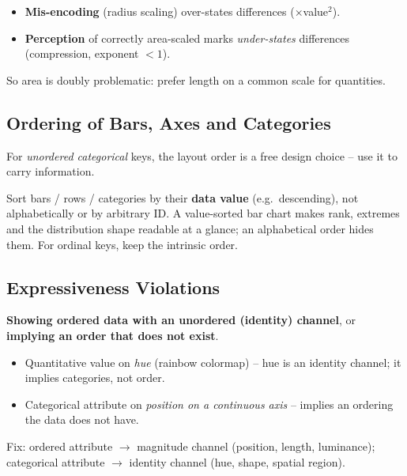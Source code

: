 \begin{keybox}
\begin{itemize}
  \item \textbf{Mis-encoding} (radius scaling) over-states differences
    ($\times$value$^2$).
  \item \textbf{Perception} of correctly area-scaled marks \emph{under-states}
    differences (compression, exponent $<1$).
\end{itemize}
So area is doubly problematic: prefer length on a common scale for quantities.
\end{keybox}

\subsection{Ordering of Bars, Axes and Categories}

For \emph{unordered categorical} keys, the layout order is a free design
choice -- use it to carry information.

\begin{keybox}
Sort bars / rows / categories by their \textbf{data value} (e.g.\ descending),
not alphabetically or by arbitrary ID. A value-sorted bar chart makes rank,
extremes and the distribution shape readable at a glance; an alphabetical order
hides them. For ordinal keys, keep the intrinsic order.
\end{keybox}

\subsection{Expressiveness Violations}

\begin{pitfall}
\textbf{Showing ordered data with an unordered (identity) channel}, or
\textbf{implying an order that does not exist}.
\begin{itemize}
  \item Quantitative value on \emph{hue} (rainbow colormap) -- hue is an
    identity channel; it implies categories, not order.
  \item Categorical attribute on \emph{position on a continuous axis} -- implies
    an ordering the data does not have.
\end{itemize}
Fix: ordered attribute $\to$ magnitude channel (position, length, luminance);
categorical attribute $\to$ identity channel (hue, shape, spatial region).
\end{pitfall}

